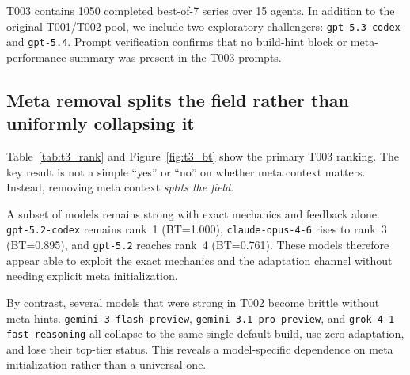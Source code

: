 \documentclass[11pt]{article}
\newcommand{\tOne}{T001}
\newcommand{\tTwo}{T002}
\newcommand{\tThree}{T003}
\begin{document}
\tThree{} contains 1050 completed best-of-7 series over 15 agents.
In addition to the original \tOne/\tTwo{} pool, we include two exploratory challengers: \texttt{gpt-5.3-codex} and \texttt{gpt-5.4}.
Prompt verification confirms that no build-hint block or meta-performance summary was present in the \tThree{} prompts.

\subsection{Meta removal splits the field rather than uniformly collapsing it}

Table~\ref{tab:t3_rank} and Figure~\ref{fig:t3_bt} show the primary \tThree{} ranking.
The key result is not a simple ``yes'' or ``no'' on whether meta context matters.
Instead, removing meta context \emph{splits the field}.

A subset of models remains strong with exact mechanics and feedback alone.
\texttt{gpt-5.2-codex} remains rank~1 (BT=1.000), \texttt{claude-opus-4-6} rises to rank~3 (BT=0.895), and \texttt{gpt-5.2} reaches rank~4 (BT=0.761).
These models therefore appear able to exploit the exact mechanics and the adaptation channel without needing explicit meta initialization.

By contrast, several models that were strong in \tTwo{} become brittle without meta hints.
\texttt{gemini-3-flash-preview}, \texttt{gemini-3.1-pro-preview}, and \texttt{grok-4-1-fast-reasoning} all collapse to the same single default build, use zero adaptation, and lose their top-tier status.
This reveals a model-specific dependence on meta initialization rather than a universal one.
\end{document}

